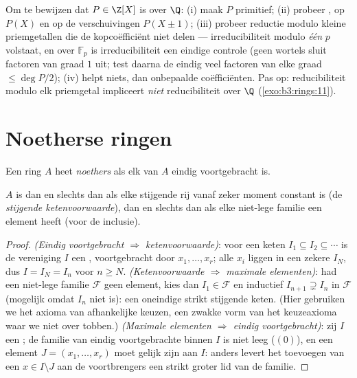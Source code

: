 \begin{method}\label{met:b3:rings:irreducibility}
Om te bewijzen dat $P \in \Z[X]$  is over $\Q$: (i) maak
$P$ primitief; (ii) probeer , op $P(X)$ en op de
verschuivingen $P(X \pm 1)$; (iii) probeer reductie modulo kleine
priemgetallen die de kopcoëfficiënt niet delen ---
irreducibiliteit modulo \emph{één} $p$ volstaat, en over $\mathbb
F_p$ is irreducibiliteit een eindige controle (geen wortels sluit
factoren van graad $1$ uit; test daarna de eindig veel factoren
van elke graad $\leq \deg P/2$); (iv) helpt niets, dan
onbepaalde coëfficiënten. Pas op: reducibiliteit modulo elk
priemgetal impliceert \emph{niet} reducibiliteit over $\Q$
(\cref{exo:b3:rings:11}).
\end{method}

\section{Noetherse ringen}

\begin{definition}\label{def:b3:rings:noetherian}
Een ring $A$ heet \emph{noethers} als elk
 van $A$ eindig voortgebracht is.
\end{definition}

\begin{proposition}\label{prop:b3:rings:noethacc}
$A$ is  dan en slechts dan als elke stijgende rij 
vanaf zeker moment constant is (de \emph{stijgende
ketenvoorwaarde}), dan en slechts dan als elke niet-lege familie
 een  element heeft (voor de inclusie).
\end{proposition}

\begin{proof}
\emph{(Eindig voortgebracht $\Rightarrow$ ketenvoorwaarde)}: voor
een keten $I_1 \subseteq I_2 \subseteq \cdots$ is de vereniging $I$
een , voortgebracht door $x_1, \dots, x_r$; alle $x_i$ liggen
in een zekere $I_N$, dus $I = I_N = I_n$ voor $n \geq N$.
\emph{(Ketenvoorwaarde $\Rightarrow$ maximale elementen)}: had een
niet-lege familie $\mathcal F$ geen  element, kies dan $I_1
\in \mathcal F$ en inductief $I_{n+1} \supsetneq I_n$ in $\mathcal
F$ (mogelijk omdat $I_n$ niet  is): een oneindige strikt
stijgende keten. (Hier gebruiken we het axioma van afhankelijke
keuzen, een zwakke vorm van het keuzeaxioma waar we niet over
tobben.) \emph{(Maximale elementen $\Rightarrow$ eindig
voortgebracht)}: zij $I$ een ; de familie van eindig
voortgebrachte  binnen $I$ is niet leeg ($(0)$), en een
 element $J = (x_1, \dots, x_r)$ moet gelijk zijn aan $I$:
anders levert het toevoegen van een $x \in I \setminus J$ aan de
voortbrengers een strikt groter lid van de familie.
\end{proof}

